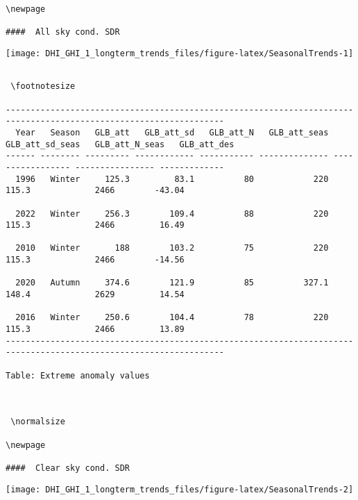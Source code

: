 \documentclass[
  10pt,
  a4paper,oneside]{article}
\begin{document}
\begin{verbatim}
\newpage

####  All sky cond. SDR 
\end{verbatim}

\begin{center}\texttt{[image: DHI\_GHI\_1\_longterm\_trends\_files/figure-latex/SeasonalTrends-1]} \end{center}

\begin{verbatim}
 
 \footnotesize 
 
------------------------------------------------------------------------------------------------------------------
  Year   Season   GLB_att   GLB_att_sd   GLB_att_N   GLB_att_seas   GLB_att_sd_seas   GLB_att_N_seas   GLB_att_des
------ -------- --------- ------------ ----------- -------------- ----------------- ---------------- -------------
  1996   Winter     125.3         83.1          80            220             115.3             2466        -43.04

  2022   Winter     256.3        109.4          88            220             115.3             2466         16.49

  2010   Winter       188        103.2          75            220             115.3             2466        -14.56

  2020   Autumn     374.6        121.9          85          327.1             148.4             2629         14.54

  2016   Winter     250.6        104.4          78            220             115.3             2466         13.89
------------------------------------------------------------------------------------------------------------------

Table: Extreme anomaly values


 
 \normalsize 
 
\newpage

####  Clear sky cond. SDR 
\end{verbatim}

\begin{center}\texttt{[image: DHI\_GHI\_1\_longterm\_trends\_files/figure-latex/SeasonalTrends-2]} \end{center}
\end{document}
